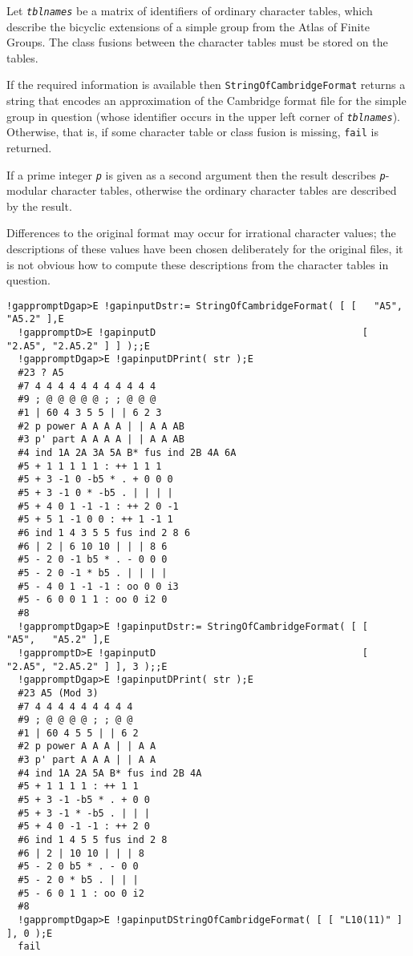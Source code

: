\documentclass[a4paper,11pt]{report}
\begin{document}
{{{ Let \mbox{\texttt{\mdseries\slshape tblnames}} be a matrix of identifiers of ordinary character tables, which describe the
bicyclic extensions of a simple group from the \textsf{Atlas} of Finite Groups. The class fusions between the character tables must be
stored on the tables. 

 If the required information is available then \texttt{StringOfCambridgeFormat} returns a string that encodes an approximation of the Cambridge format file
for the simple group in question (whose identifier occurs in the upper left
corner of \mbox{\texttt{\mdseries\slshape tblnames}}). Otherwise, that is, if some character table or class fusion is missing, \texttt{fail} is returned. 

 If a prime integer \mbox{\texttt{\mdseries\slshape p}} is given as a second argument then the result describes \mbox{\texttt{\mdseries\slshape p}}-modular character tables, otherwise the ordinary character tables are
described by the result. 

 Differences to the original format may occur for irrational character values;
the descriptions of these values have been chosen deliberately for the
original files, it is not obvious how to compute these descriptions from the
character tables in question. 

 
\begin{Verbatim}[commandchars=!DE,fontsize=\small,frame=single,label=Example]
  !gappromptDgap>E !gapinputDstr:= StringOfCambridgeFormat( [ [   "A5",   "A5.2" ],E
  !gappromptD>E !gapinputD                                    [ "2.A5", "2.A5.2" ] ] );;E
  !gappromptDgap>E !gapinputDPrint( str );E
  #23 ? A5
  #7 4 4 4 4 4 4 4 4 4 4 4 
  #9 ; @ @ @ @ @ ; ; @ @ @ 
  #1 | 60 4 3 5 5 | | 6 2 3 
  #2 p power A A A A | | A A AB 
  #3 p' part A A A A | | A A AB 
  #4 ind 1A 2A 3A 5A B* fus ind 2B 4A 6A 
  #5 + 1 1 1 1 1 : ++ 1 1 1 
  #5 + 3 -1 0 -b5 * . + 0 0 0 
  #5 + 3 -1 0 * -b5 . | | | | 
  #5 + 4 0 1 -1 -1 : ++ 2 0 -1 
  #5 + 5 1 -1 0 0 : ++ 1 -1 1 
  #6 ind 1 4 3 5 5 fus ind 2 8 6 
  #6 | 2 | 6 10 10 | | | 8 6 
  #5 - 2 0 -1 b5 * . - 0 0 0 
  #5 - 2 0 -1 * b5 . | | | | 
  #5 - 4 0 1 -1 -1 : oo 0 0 i3 
  #5 - 6 0 0 1 1 : oo 0 i2 0 
  #8
  !gappromptDgap>E !gapinputDstr:= StringOfCambridgeFormat( [ [   "A5",   "A5.2" ],E
  !gappromptD>E !gapinputD                                    [ "2.A5", "2.A5.2" ] ], 3 );;E
  !gappromptDgap>E !gapinputDPrint( str );E
  #23 A5 (Mod 3)
  #7 4 4 4 4 4 4 4 4 4 
  #9 ; @ @ @ @ ; ; @ @ 
  #1 | 60 4 5 5 | | 6 2 
  #2 p power A A A | | A A 
  #3 p' part A A A | | A A 
  #4 ind 1A 2A 5A B* fus ind 2B 4A 
  #5 + 1 1 1 1 : ++ 1 1 
  #5 + 3 -1 -b5 * . + 0 0 
  #5 + 3 -1 * -b5 . | | | 
  #5 + 4 0 -1 -1 : ++ 2 0 
  #6 ind 1 4 5 5 fus ind 2 8 
  #6 | 2 | 10 10 | | | 8 
  #5 - 2 0 b5 * . - 0 0 
  #5 - 2 0 * b5 . | | | 
  #5 - 6 0 1 1 : oo 0 i2 
  #8
  !gappromptDgap>E !gapinputDStringOfCambridgeFormat( [ [ "L10(11)" ] ], 0 );E
  fail
\end{Verbatim}
 

}}}
\end{document}
